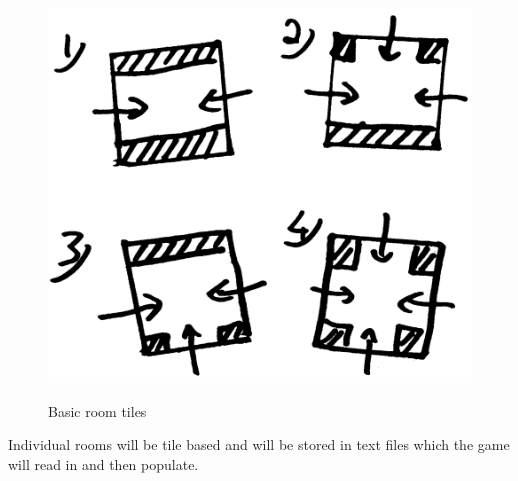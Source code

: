\begin{figure}[ht]
\centering
\includegraphics[scale=0.2, trim = 0cm 0cm 0cm -1cm]{images/16x16}
\label{fig:16x}
\caption{Basic room tiles}
\end{figure}

Individual rooms will be tile based and will be stored in text files which the game will read in and then populate.
